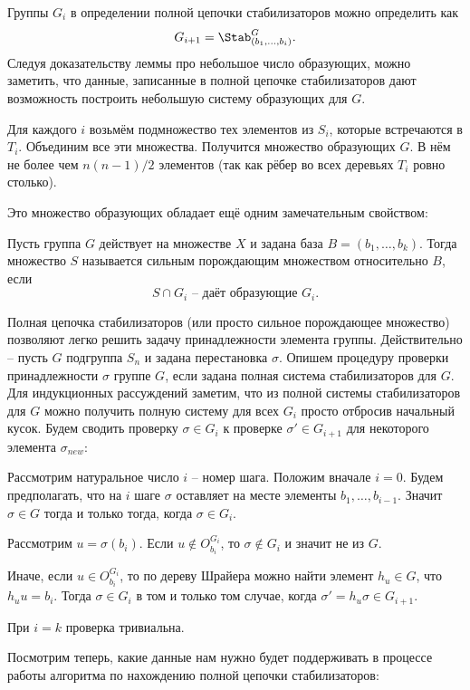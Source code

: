 Группы $G_i$ в определении полной цепочки стабилизаторов можно определить как
$$G_{i+1} = \Stab_{(b_1,\dots,b_i)}^G.$$
Следуя доказательству леммы про небольшое число образующих, можно заметить, что данные, записанные в полной цепочке стабилизаторов дают возможность построить небольшую систему образующих для $G$.

\rm Для каждого $i$ возьмём подмножество тех элементов из $S_i$, которые встречаются в $T_i$. Объединим все эти множества. Получится множество образующих $G$. В нём не более чем $n(n-1)/2$ элементов (так как рёбер во всех деревьях $T_i$ ровно столько). 
\erm

Это множество образующих обладает ещё одним замечательным свойством:

 Пусть группа $G$ действует на множестве $X$ и задана база $B=(b_1,\dots,b_k)$. Тогда множество $S$ называется сильным порождающим множеством относительно $B$, если 
$$S\cap G_i \text{ -- даёт образующие } G_i.$$ 
\edfn

Полная цепочка стабилизаторов (или просто сильное порождающее множество) позволяют легко решить задачу принадлежности элемента группы. Действительно -- пусть $G$ подгруппа $S_n$ и задана перестановка $\sigma$. Опишем процедуру проверки принадлежности $\sigma$ группе $G$, если задана полная система стабилизаторов для $G$.  Для индукционных рассуждений заметим, что из полной системы стабилизаторов для $G$ можно получить полную систему для всех $G_i$ просто отбросив начальный кусок. Будем сводить проверку $\sigma \in G_i$ к проверке $\sigma'\in G_{i+1}$ для некоторого элемента $\sigma_{new}$:
\enm
\item Рассмотрим натуральное число $i$ -- номер шага. Положим вначале $i=0$. Будем предполагать, что на $i$ шаге $\sigma$ оставляет на месте элементы $b_1,\dots,b_{i-1}$. Значит $\sigma \in G$ тогда и только тогда, когда $\sigma \in G_i$.
\item Рассмотрим $u=\sigma(b_i)$. Если $u\notin O_{b_i}^{G_i}$, то $\sigma \notin G_i$ и значит не из $G$.
\item Иначе, если $u\in O_{b_i}^{G_i}$, то по дереву Шрайера можно найти элемент $h_u\in G$, что $h_u u=b_i$. Тогда $\sigma \in G_i$ в том и только том случае, когда $\sigma'=h_u\sigma \in G_{i+1}$.
\item При $i=k$ проверка тривиальна.
\eenm

Посмотрим теперь, какие данные нам нужно будет поддерживать в процессе работы алгоритма по нахождению полной цепочки стабилизаторов:

